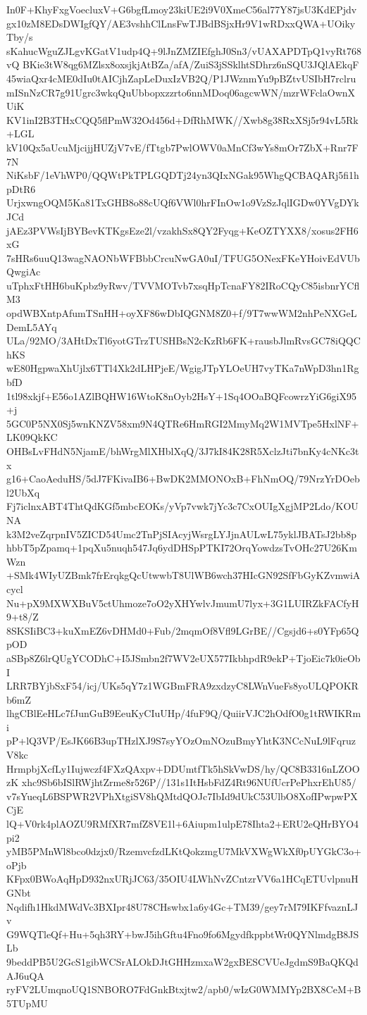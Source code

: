 In0F+KhyFxgVoecluxV+G6bgfLmoy23kiUE2i9V0XmeC56al77Y87jsU3KdEPjdv
gx10zM8EDsDWIgfQY/AE3vshhClLnsFwTJBdBSjxHr9V1wRDxxQWA+UOikyTby/s
sKahucWguZJLgvKGatV1udp4Q+9lJnZMZIEfghJ0Sn3/vUAXAPDTpQ1vyRt768vQ
BKie3tW8qg6MZlsx8oxsjkjAtBZa/afA/ZuiS3jSSklhtSDhrz6nSQU3JQlAEkqF
45wiaQxr4cME0dIu0tAICjhZapLeDuxIzVB2Q/P1JWznmYu9pBZtvUSIbH7rclru
mISnNzCR7g91Ugrc3wkqQuUbbopxzzrto6nnMDoq06agcwWN/mzrWFclaOwnXUiK
KV1inI2B3THxCQQ5flPmW32Od456d+DfRhMWK//Xwb8g38RxXSj5r94vL5Rk+LGL
kV10Qx5aUcuMjcijjHUZjV7vE/fTtgb7PwlOWV0aMnCf3wYs8mOr7ZbX+Rnr7F7N
NiKsbF/1eVhWP0/QQWtPkTPLGQDTj24yn3QIxNGak95WhgQCBAQARj5fi1hpDtR6
UrjxwngOQM5Ka81TxGHB8o88cUQf6VWl0hrFInOw1o9VzSzJqlIGDw0YVgDYkJCd
jAEz3PVWsIjBYBevKTKgsEze2l/vzakhSx8QY2Fyqg+KeOZTYXX8/xosus2FH6xG
7sHRs6uuQ13wagNAONbWFBbbCrcuNwGA0uI/TFUG5ONexFKeYHoivEdVUbQwgiAc
uTphxFtHH6buKpbz9yRwv/TVVMOTvb7xsqHpTcnaFY82IRoCQyC85isbnrYCflM3
opdWBXntpAfumTSnHH+oyXF86wDbIQGNM8Z0+f/9T7wwWM2nhPeNXGeLDemL5AYq
ULa/92MO/3AHtDxTl6yotGTrzTUSHBsN2cKzRb6FK+rausbJlmRvsGC78iQQChKS
wE80HgpwaXhUjlx6TTl4Xk2dLHPjeE/WgigJTpYLOeUH7vyTKa7nWpD3hn1RgbfD
1tl98xkjf+E56o1AZlBQHW16WtoK8nOyb2HsY+1Sq4OOaBQFcowrzYiG6giX95+j
5GC0P5NX0Sj5wnKNZV58xm9N4QTRe6HmRGI2MmyMq2W1MVTpe5HxlNF+LK09QkKC
OHBsLvFHdN5NjamE/bhWrgMlXHblXqQ/3J7kI84K28R5XclzJti7bnKy4cNKc3tx
g16+CaoAeduHS/5dJ7FKivaIB6+BwDK2MMONOxB+FhNmOQ/79NrzYrDOebl2UbXq
Fj7iclnxABT4ThtQdKGf5mbcEOKs/yVp7vwk7jYc3c7CxOUIgXgjMP2Ldo/KOUNA
k3M2veZqrpnIV5ZICD54Umc2TnPjSIAcyjWsrgLYJjnAULwL75yklJBATsJ2bb8p
hbbT5pZpamq+1pqXu5nuqh547Jq6ydDHSpPTKI72OrqYowdzsTvOHc27U26KmWzn
+SMk4WIyUZBmk7frErqkgQcUtwwbT8UlWB6wch37HIcGN92SfFbGyKZvmwiAcycl
Nu+pX9MXWXBuV5ctUhmoze7oO2yXHYwlvJmumU7lyx+3G1LUIRZkFACfyH9+t8/Z
8SKSIiBC3+kuXmEZ6vDHMd0+Fub/2mqmOf8Vfl9LGrBE//Cgsjd6+s0YFp65QpOD
aSBp8Z6lrQUgYCODhC+I5JSmbn2f7WV2eUX577IkbhpdR9ekP+TjoEic7k0ieObI
LRR7BYjbSxF54/icj/UKs5qY7z1WGBmFRA9zxdzyC8LWnVueFs8yoULQPOKRb6mZ
lhgCBlEeHLc7fJunGuB9EeuKyCIuUHp/4fuF9Q/QuiirVJC2hOdfO0g1tRWIKRmi
pP+lQ3VP/EsJK66B3upTHzlXJ9S7syYOzOmNOzuBmyYhtK3NCcNuL9lFqruzV8kc
HrmpbjXcfLy1Iujwczf4FXzQAxpv+DDUmtfTk5hSkVwDS/hy/QC8B3316nLZOOzK
xhc9Sb6bISlRWjhtZrme8r526P//131s1ItHsbFdZ4Rt96NUfUcrPePhxrEhU85/
v7sYueqL6BSPWR2VPhXtgiSV8hQMtdQOJc7IbId9dUkC53UlbO8XofIPwpwPXCjE
lQ+V0rk4plAOZU9RMfXR7mfZ8VE1l+6Aiupm1ulpE78Ihta2+ERU2eQHrBYO4pi2
yMB5PMnWl8bco0dzjx0/RzemvcfzdLKtQokzmgU7MkVXWgWkXf0pUYGkC3o+oPjb
KFpx0BWoAqHpD932nxURjJC63/35OIU4LWhNvZCntzrVV6a1HCqETUvlpnuHGNbt
Nqdifh1HkdMWdVc3BXIpr48U78CHswbx1a6y4Gc+TM39/gey7rM79IKFfvaznLJv
G9WQTleQf+Hu+5qh3RY+bwJ5ihGftu4Fno9fo6MgydfkppbtWr0QYNlmdgB8JSLb
9beddPB5U2GcS1gibWCSrALOkDJtGHHzmxaW2gxBESCVUeJgdmS9BaQKQdAJ6uQA
ryFV2LUmqnoUQ1SNBORO7FdGnkBtxjtw2/apb0/wIzG0WMMYp2BX8CeM+B5TUpMU

